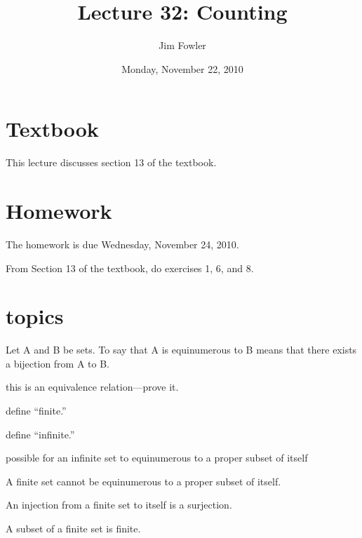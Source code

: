 \documentclass[12pt]{handout}
\title{Lecture 32: Counting}
\author{Jim Fowler}
\date{Monday, November 22, 2010}
\begin{document}
\maketitle

\section*{Textbook}

This lecture discusses section 13 of the textbook.

\section*{Homework} 

The homework is due Wednesday, November 24, 2010.

From Section 13 of the textbook, do exercises 1, 6, and 8.

\section*{topics}

 Let A and B be sets. To say that A is equinumerous to B means that
 there exists a bijection from A to B.

this is an equivalence relation---prove it.

define ``finite.''

define ``infinite.''

possible for an infinite set to equinumerous to a proper subset of
itself

A finite set cannot be equinumerous to a proper
subset of itself.

An injection from a finite set to itself is a surjection.

A subset of a finite set is finite.
\end{document}
